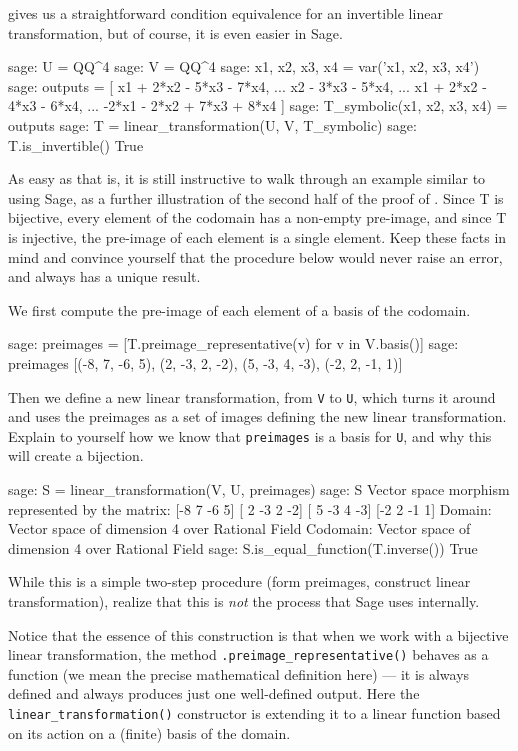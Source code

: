  gives us a straightforward condition equivalence for an invertible linear transformation, but of course, it is even easier in Sage.
%
\begin{sageexample}
sage: U = QQ^4
sage: V = QQ^4
sage: x1, x2, x3, x4 = var('x1, x2, x3, x4')
sage: outputs = [   x1 + 2*x2 - 5*x3 - 7*x4,
...                        x2 - 3*x3 - 5*x4,
...                 x1 + 2*x2 - 4*x3 - 6*x4,
...              -2*x1 - 2*x2 + 7*x3 + 8*x4 ]
sage: T_symbolic(x1, x2, x3, x4) = outputs
sage: T = linear_transformation(U, V, T_symbolic)
sage: T.is_invertible()
True
\end{sageexample}
%
As easy as that is, it is still instructive to walk through an example similar to  using Sage, as a further illustration of the second half of the proof of .  Since T is bijective, every element of the codomain has a non-empty pre-image, and since T is injective, the pre-image of each element is a single element.  Keep these facts in mind and convince yourself that the procedure below would never raise an error, and always has a unique result.\par
%
We first compute the pre-image of each element of a basis of the codomain.
%
\begin{sageexample}
sage: preimages = [T.preimage_representative(v) for v in V.basis()]
sage: preimages
[(-8, 7, -6, 5), (2, -3, 2, -2), (5, -3, 4, -3), (-2, 2, -1, 1)]
\end{sageexample}
%
Then we define a new linear transformation, from \verb?V? to \verb?U?, which turns it around and uses the preimages as a set of images defining the new linear transformation.  Explain to yourself how we know that \verb?preimages? is a basis for \verb?U?, and why this will create a bijection.
%
\begin{sageexample}
sage: S = linear_transformation(V, U, preimages)
sage: S
Vector space morphism represented by the matrix:
[-8  7 -6  5]
[ 2 -3  2 -2]
[ 5 -3  4 -3]
[-2  2 -1  1]
Domain: Vector space of dimension 4 over Rational Field
Codomain: Vector space of dimension 4 over Rational Field
sage: S.is_equal_function(T.inverse())
True
\end{sageexample}
%
While this is a simple two-step procedure (form preimages, construct linear transformation), realize that this is \emph{not} the process that Sage uses internally.\par
%
Notice that the essence of this construction is that when we work with a bijective linear transformation, the method \verb?.preimage_representative()? behaves as a function (we mean the precise mathematical definition here) --- it is always defined and always produces just one well-defined output.  Here the \verb?linear_transformation()? constructor is extending it to a linear function based on its action on a (finite) basis of the domain.
%
\begin{sageverbatim}
\end{sageverbatim}
%
